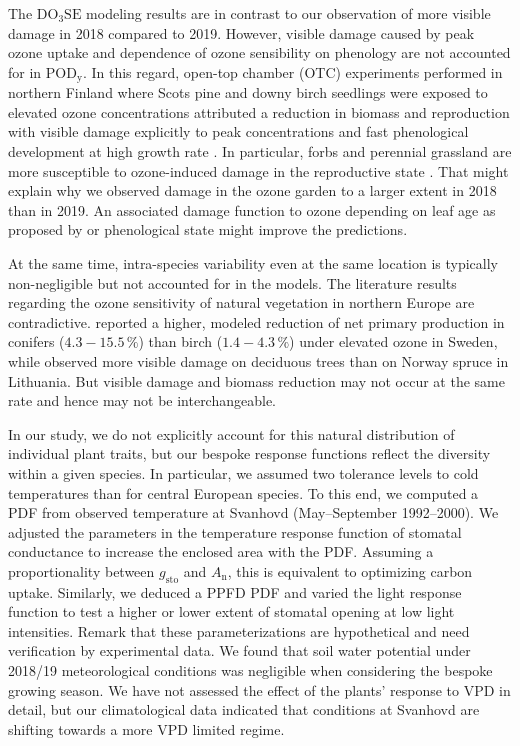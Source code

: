 \documentclass[bg, manuscript]{copernicus}
\begin{document}
 The $\mathrm{DO_3SE}$ modeling results are in contrast to our observation of more visible damage in 2018 compared to 2019. However, visible damage caused by peak ozone uptake and dependence of ozone sensibility on phenology are not accounted for in $\mathrm{POD_y}$. In this regard, open-top chamber (OTC) experiments performed in northern Finland where Scots pine and downy birch seedlings were exposed to elevated ozone concentrations attributed a reduction in biomass and reproduction with visible damage explicitly to peak  concentrations and fast phenological development at high growth rate \citep{Amb:Manninen2009}. In particular, forbs and perennial grassland are more susceptible to ozone-induced damage in the reproductive state \citep{EP:Bassin2004}. 
That might explain why we observed damage in the ozone garden to a larger extent in 2018 than in 2019. An associated damage function to ozone depending on leaf age as proposed by \citet{AE:Musselman2006} or phenological state might improve the predictions.

At the same time, intra-species variability even at the same location is typically non-negligible \citep{EP:Bassin2004} but not accounted for in the models. The literature results regarding the ozone sensitivity of natural vegetation in northern Europe are contradictive. \citet{FS:Subramanian2014} reported a higher, modeled reduction of net primary production in conifers ($4.3-15.5\,\unit{\%}$) than birch ($1.4-4.3\,\unit{\%}$) under elevated ozone in Sweden, while \citet{Amb:Girgzdiene2009} observed more visible damage on deciduous trees than on Norway spruce in Lithuania. But visible damage and biomass reduction may not occur at the same rate and hence may not be interchangeable. 

In our study, we do not explicitly account for this natural distribution of individual plant traits, but our bespoke response functions reflect the diversity within a given species. In particular, we assumed two tolerance levels to cold temperatures than for central European species. To this end, we computed a PDF from observed temperature at Svanhovd (May--September 1992--2000). We adjusted the parameters in the temperature response function of stomatal conductance to increase the enclosed area with the PDF. Assuming a proportionality between $g_\mathrm{sto}$ and $A_\mathrm{n}$, this is equivalent to optimizing carbon uptake. Similarly, we deduced a PPFD PDF and varied the light response function to test a higher or lower extent of stomatal opening at low light intensities. Remark that these parameterizations are hypothetical and need verification by experimental data. We found that soil water potential under 2018/19 meteorological conditions was negligible when considering the bespoke growing season. We have not assessed the effect of the plants' response to VPD in detail, but our climatological data indicated that conditions at Svanhovd are shifting towards a more VPD limited regime. 
\end{document}
